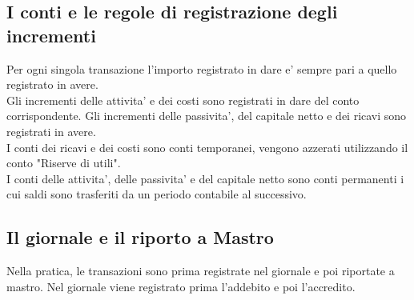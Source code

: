 \documentclass{report}
\begin{document}
	\subsection{I conti e le regole di registrazione degli incrementi}
	Per ogni singola transazione l'importo registrato in dare e' sempre pari a quello registrato in avere. \medskip \\Gli incrementi delle attivita' e dei costi sono registrati in dare del conto corrispondente. Gli incrementi delle passivita', del capitale netto e dei ricavi sono registrati in avere. \medskip \\I conti dei ricavi e dei costi sono conti temporanei, vengono azzerati utilizzando il conto "Riserve di utili".\medskip \\I conti delle attivita', delle passivita' e del capitale netto sono conti permanenti i cui saldi sono trasferiti da un periodo contabile al successivo.
	\subsection{Il giornale e il riporto a Mastro}
	Nella pratica, le transazioni sono prima registrate nel giornale e poi riportate a mastro. Nel giornale viene registrato prima l'addebito e poi l'accredito.
\end{document}
